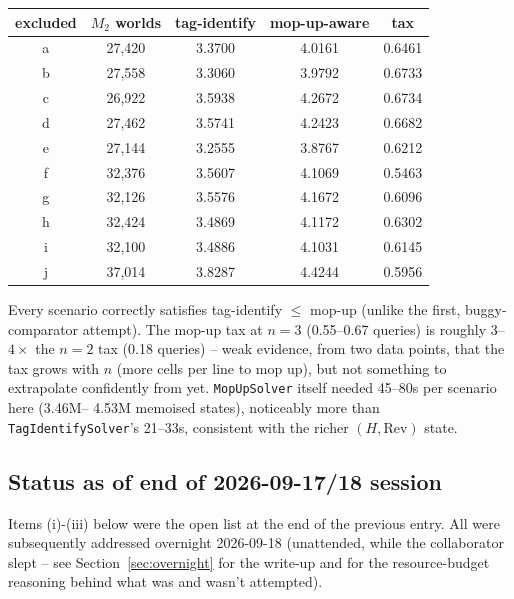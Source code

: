 \documentclass[11pt]{article}
\begin{document}
\begin{center}
\begin{tabular}{ccccc}
\toprule
excluded & $M_2$ worlds & tag-identify & mop-up-aware & tax \\
\midrule
a & 27{,}420 & 3.3700 & 4.0161 & 0.6461 \\
b & 27{,}558 & 3.3060 & 3.9792 & 0.6733 \\
c & 26{,}922 & 3.5938 & 4.2672 & 0.6734 \\
d & 27{,}462 & 3.5741 & 4.2423 & 0.6682 \\
e & 27{,}144 & 3.2555 & 3.8767 & 0.6212 \\
f & 32{,}376 & 3.5607 & 4.1069 & 0.5463 \\
g & 32{,}126 & 3.5576 & 4.1672 & 0.6096 \\
h & 32{,}424 & 3.4869 & 4.1172 & 0.6302 \\
i & 32{,}100 & 3.4886 & 4.1031 & 0.6145 \\
j & 37{,}014 & 3.8287 & 4.4244 & 0.5956 \\
\bottomrule
\end{tabular}
\end{center}

Every scenario correctly satisfies tag-identify $\le$ mop-up (unlike the
first, buggy-comparator attempt). The mop-up tax at $n=3$ (0.55--0.67
queries) is roughly $3$--$4\times$ the $n=2$ tax (0.18 queries) -- weak
evidence, from two data points, that the tax grows with $n$ (more cells
per line to mop up), but not something to extrapolate confidently from
yet. \texttt{MopUpSolver} itself needed 45--80s per scenario here (3.46M--
4.53M memoised states), noticeably more than \texttt{TagIdentifySolver}'s
21--33s, consistent with the richer $(H,\mathrm{Rev})$ state.

\subsection{Status as of end of 2026-09-17/18 session}

Items (i)-(iii) below were the open list at the end of the previous
entry. All were subsequently addressed overnight 2026-09-18 (unattended,
while the collaborator slept -- see Section~\ref{sec:overnight} for the
write-up and for the resource-budget reasoning behind what was and
wasn't attempted).
\end{document}
